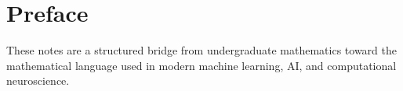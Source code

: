 \section*{Preface}
These notes are a structured bridge from undergraduate mathematics toward the mathematical language used in modern machine learning, AI, and computational neuroscience.
